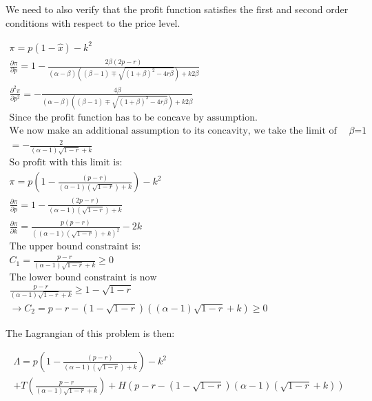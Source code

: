 \documentclass{article}
\begin{document}
We need to also verify that the profit function satisfies the first and second order conditions with respect to the price level. 

\begin{align*}
\pi = p\left(1-\hat{x}\right) - k^2 \\
\frac{\partial \pi }{\partial p} = 1-\frac{2\beta (2p-r)}{(\alpha-\beta) 
\left( 
(\beta-1) \mp \sqrt{ \left(1+\beta\right)^2 -4r\beta } 
\right)+k2\beta} \\
\frac{\partial^2 \pi }{\partial p^2}  
= -\frac{4\beta }{(\alpha-\beta) 
\left( 
(\beta-1) \mp \sqrt{ \left(1+\beta\right)^2 -4r\beta } 
\right)+k2\beta} \\
\text{Since the profit function has to be concave by assumption.} \\
\text{We now make an additional assumption to its concavity, we take the limit of this expression as $\beta$=1}. \\
= -\frac{2 }{(\alpha-1) 
\sqrt{ 1 -r } 
+k} \\
\text{So profit with this limit is:} \\
\pi = p\left(1-\frac{ (p-r)}{(\alpha-1) 
\left( \sqrt{ 1-r } 
\right)+k} \right) -k^2 \\
\frac{\partial \pi}{\partial p}
= 1-\frac{ (2p-r)}{(\alpha-1) 
\left( \sqrt{ 1-r } 
\right)+k} \\
\frac{\partial \pi}{\partial k} = \frac{ p(p-r)}{((\alpha-1) 
\left( \sqrt{ 1-r } 
\right)+k)^2} -2k \\
\text{The upper bound constraint is:} \\
C_1 = \frac{p-r}{(\alpha-1)\sqrt{1-r}+k} \geq 0 \\
\text{The lower bound constraint is now} \\
 \frac{p-r}{(\alpha-1)
\sqrt{1-r}+k 
} \geq 1 - \sqrt{1-r} \\
\rightarrow 
C_2 = p-r-(1-\sqrt{1-r})\left((\alpha-1)\sqrt{1-r} +k \right) \geq 0
\end{align*}


The Lagrangian of this problem is then: 

\begin{align*}
\Lambda = p\left(1-\frac{ (p-r)}{(\alpha-1) 
\left( \sqrt{ 1-r } 
\right)+k} \right) -k^2 \\ 
+T
\left(
\frac{p-r}{(\alpha-1)\sqrt{1-r}+k}
\right) 
+ H
\left(
p-r-(1-\sqrt{1-r})(\alpha-1)\left(\sqrt{1-r} +k \right) 
\right) \\
\end{align*}
\end{document}
